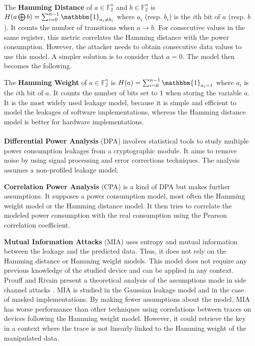 \documentclass[11pt]{sdm}
\begin{document}
\paragraph{}
The \textbf{Hamming Distance} of $a \in \mathbb{F}_2^n$ and $b \in \mathbb{F}_2^n$ is $H(a \bigoplus b) = \sum_{i=0}^{n-1} \mathbbm{1}_{a_i \neq b_i}$ where $a_i$ (resp. $b_i$) is the $i$th bit of $a$ (resp. $b$).
It counts the number of transitions when $a \rightarrow b$.
For consecutive values in the same register, this metric correlates the Hamming distance with the power consumption.
However, the attacker needs to obtain consecutive data values to use this model.
A simpler solution is to consider that $a=0$. The model then becomes the following.

The \textbf{Hamming Weight} of $a \in \mathbb{F}_2^n$ is $H(a) = \sum_{i=0}^{n-1} \mathbbm{1}_{a_i = 1}$ where $a_i$ is the $i$th bit of $a$.
It counts the number of bits set to 1 when storing the variable $a$.
It is the most widely used leakage model, because it is simple and efficient to model the leakages of software implementations, whereas the Hamming distance model is better for hardware implementations.

\paragraph{}
\textbf{Differential Power Analysis} (DPA) involves statistical tools to study multiple power consumption leakages from a cryptographic module.
It aims to remove noise by using signal processing and error corrections techniques.
The analysis assumes a non-profiled leakage model.

\smallbreak
\textbf{Correlation Power Analysis} (CPA) is a kind of DPA but makes further assumptions.
It supposes a power consumption model, most often the Hamming weight model or the Hamming distance model.
It then tries to correlate the modeled power consumption with the real consumption using the Pearson correlation coefficient. %

\smallbreak
\textbf{Mutual Information Attacks} (MIA) uses entropy and mutual information between the leakage and the predicted data.
Thus, it does not rely on the Hamming distance or Hamming weight models.
This model does not require any previous knowledge of the studied device and can be applied in any context.
Prouff and Rivain present a theoretical analysis of the assumptions made in side channel attacks \parencite{Prouff_Rivain_2009}.
MIA is studied in the Gaussian leakage model and in the case of masked implementations.
By making fewer assumptions about the model, MIA has worse performance than other techniques using correlations between traces on devices following the Hamming weight model.
However, it could retrieve the key in a context where the trace is not linearly linked to the Hamming weight of the manipulated data.
\end{document}
